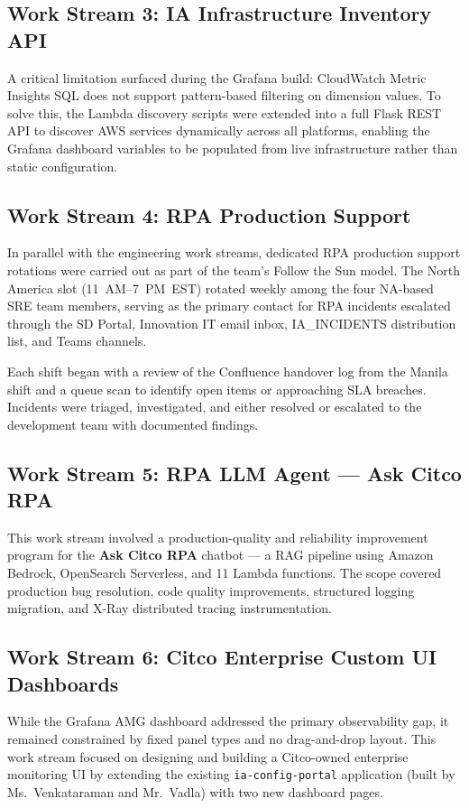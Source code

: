 \subsection{Work Stream 3: IA Infrastructure Inventory API}

A critical limitation surfaced during the Grafana build: CloudWatch Metric
Insights SQL does not support pattern-based filtering on dimension values.
To solve this, the Lambda discovery scripts were extended into a full Flask
REST API to discover AWS services dynamically across all platforms, enabling
the Grafana dashboard variables to be populated from live infrastructure
rather than static configuration.

\subsection{Work Stream 4: RPA Production Support}

In parallel with the engineering work streams, dedicated RPA production
support rotations were carried out as part of the team's Follow the Sun
model. The North America slot (11~AM--7~PM~EST) rotated weekly among the four
NA-based SRE team members, serving as the primary contact for RPA incidents escalated through
the SD Portal, Innovation IT email inbox, IA\_INCIDENTS distribution list,
and Teams channels.

Each shift began with a review of the Confluence handover log from the Manila
shift and a queue scan to identify open items or approaching SLA breaches.
Incidents were triaged, investigated, and either resolved or escalated to
the development team with documented findings.

\subsection{Work Stream 5: RPA LLM Agent --- Ask Citco RPA}

This work stream involved a production-quality and reliability improvement
program for the \textbf{Ask Citco RPA} chatbot --- a RAG pipeline using
Amazon Bedrock, OpenSearch Serverless, and 11 Lambda functions. The scope
covered production bug resolution, code quality improvements, structured
logging migration, and X-Ray distributed tracing instrumentation.

\subsection{Work Stream 6: Citco Enterprise Custom UI Dashboards}

While the Grafana AMG dashboard addressed the primary observability gap,
it remained constrained by fixed panel types and no drag-and-drop layout.
This work stream focused on designing and building a Citco-owned enterprise
monitoring UI by extending the existing \texttt{ia-config-portal} application
(built by Ms.\ Venkataraman and Mr.\ Vadla) with two new dashboard pages.
